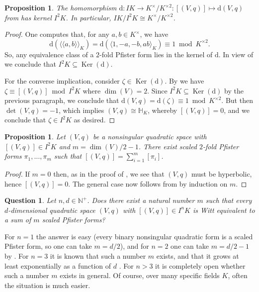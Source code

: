 \documentclass[12pt, leqno, british]{amsart}
\theoremstyle{definition}
\theoremstyle{plain}
\newtheorem{prop}[defi]{Proposition}
\newtheorem{ques}[defi]{Question}
\theoremstyle{remark}
\newcommand{\mbb}{\mathbb}
\newcommand{\nat}{\mbb N}
\DeclareMathOperator{\Ker}{Ker}
\newcommand{\disc}{\mathrm{d}}
\newcommand{\llangle}{\langle\!\langle}
\newcommand{\rrangle}{\rangle\!\rangle}
\begin{document}
\begin{prop}\label{P:disc-map-kernel}
The homomorphism
$\disc : IK \to K^\times/K^{\times 2} : [(V, q)] \mapsto \disc(V, q)$ from  has kernel $I^2 K$.
In particular, $IK/I^2K \cong K^\times / K^{\times 2}$.
\end{prop}
\begin{proof}
One computes that, for any $a, b \in K^\times$, we have
$$ \disc(\llangle a, b \rrangle_K) = \disc(\langle 1, -a, -b, ab \rangle_K) \equiv 1 \bmod K^{\times 2}.$$
So, any equivalence class of a $2$-fold Pfister form lies in the kernel of $\disc$.
In view of  we conclude that $I^2K \subseteq \Ker(\disc)$.

For the converse implication, consider $\zeta \in \Ker(\disc)$.
By  we have $\zeta \equiv [(V, q)] \bmod I^2K$ where $\dim(V) = 2$.
Since $I^2K \subseteq \Ker(\disc)$ by the previous paragraph, we conclude that $\disc(V, q) = \disc(\zeta) \equiv 1 \bmod K^{\times 2}$.
But then $\det(V, q) = -1$, which implies $(V, q) \cong \mbb{H}_K$, whereby $[(V, q)] = 0$, and we conclude that $\zeta \in I^2K$ as desired.
\end{proof}

\begin{prop}\label{P:boundI2}
Let $(V, q)$ be a nonsingular quadratic space with $[(V, q)] \in I^2K$ and $m = \dim(V)/2 - 1$.
There exist scaled $2$-fold Pfister forms $\pi_1, \ldots, \pi_m$ such that
$ [(V, q)] = \sum_{i=1}^m [\pi_i] $.
\end{prop}
\begin{proof}
If $m = 0$ then, as in the proof of , we see that $(V, q)$ must be hyperbolic, hence $[(V, q)] = 0$.
The general case now follows from  by induction on $m$.
\end{proof}
\begin{ques}\label{Q:boundIn}
Let $n, d \in \nat^+$.
Does there exist a natural number $m$ such that every $d$-dimensional quadratic space $(V, q)$ with $[(V, q)] \in I^n K$ is Witt equivalent to a sum of $m$ scaled Pfister forms?
\end{ques}
For $n = 1$ the answer is easy (every binary nonsingular quadratic form is a scaled Pfister form, so one can take $m = d/2$), and for $n = 2$ one can take $m = d/2 - 1$ by .
For $n = 3$ it is known that such a number $m$ exists, and that it grows at least exponentially as a function of $d$ \autocite{EssentialDimensionI3K}.
For $n > 3$ it is completely open whether such a number $m$ exists in general.
Of course, over many specific fields $K$, often the situation is much easier.
\end{document}
